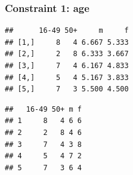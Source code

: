\subsubsection{Constraint 1: age}

\begin{Shaded}
\begin{Highlighting}[]
\NormalTok{:}
    \NormalTok{weights1[}\NormalTok{), j] <- all.msim[j, }\NormalTok{]/USd.agg[j, }\NormalTok{]}
    \NormalTok{weights1[}\NormalTok{), j] <- all.msim[j, }\NormalTok{]/USd.agg[j, }\NormalTok{]}
\NormalTok{\}}
\NormalTok{:}
\NormalTok{\}}
\end{Highlighting}
\end{Shaded}
\begin{verbatim}
##      16-49 50+     m     f
## [1,]     8   4 6.667 5.333
## [2,]     2   8 6.333 3.667
## [3,]     7   4 6.167 4.833
## [4,]     5   4 5.167 3.833
## [5,]     7   3 5.500 4.500
\end{verbatim}
\begin{Shaded}
\begin{Highlighting}[]
\end{Highlighting}
\end{Shaded}
\begin{verbatim}
##   16-49 50+ m f
## 1     8   4 6 6
## 2     2   8 4 6
## 3     7   4 3 8
## 4     5   4 7 2
## 5     7   3 6 4
\end{verbatim}
\begin{Shaded}
\begin{Highlighting}[]
\NormalTok{(}\NormalTok{(}\NormalTok{(} \NormalTok{, }
     \NormalTok{)}
\NormalTok{(} \NormalTok{, } \NormalTok{)}
\end{Highlighting}
\end{Shaded}
